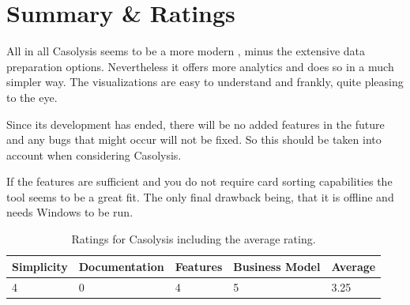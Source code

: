 \section{Summary \& Ratings}
All in all Casolysis seems to be a more modern \textcite{SynCaps},
minus the extensive data preparation options. Nevertheless it offers
more analytics and does so in a much simpler way. The visualizations
are easy to understand and frankly, quite pleasing to the eye.

Since its development has ended, there will be no added features in
the future and any bugs that might occur will not be fixed. So this
should be taken into account when considering Casolysis.

If the features are sufficient and you do not require card sorting
capabilities the tool seems to be a great fit. The only final drawback
being, that it is offline and needs Windows to be run.


\begin{table}[tp] 
\centering 
\begin{tabularx}{\linewidth}{|X|X|X|X|X|}
\hline
Simplicity & Documentation & Features & Business Model & Average \\ 
\hline 
4 & 0 & 4 & 5 & 3.25 \\ 
\hline 
\end{tabularx} 
\caption[Ratings for Casolysis] {
Ratings for Casolysis including the average rating.
} 
\label{tab:rating-Casolysis}
\end{table}